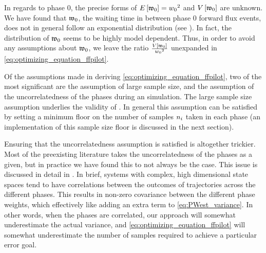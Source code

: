 In regards to phase 0, the precise forms of $E \left[ \mathfrak{w}_{0} \right] = w_{0} {}^2$ and $V \left[ \mathfrak{w}_{0} \right]$ are unknown. We have found that $\mathfrak{w}_{0}$, the waiting time in between phase 0 forward flux events, does not in general follow an exponential distribution (see ). In fact, the distribution of $\mathfrak{w}_{0}$ seems to be highly model dependent. Thus, in order to avoid any assumptions about $\mathfrak{w}_{0}$, we leave the ratio $\frac{V \left[ \mathfrak{w}_{0} \right]}{w_{0} {}^2}$ unexpanded in \eqref{eq:optimizing_equation_ffpilot}.

Of the assumptions made in deriving \eqref{eq:optimizing_equation_ffpilot}, two of the most significant are the assumption of large sample size, and the assumption of the uncorrelatedness of the phases during an  simulation. The large sample size assumption underlies the validity of . In general this assumption can be satisfied by setting a minimum floor on the number of samples $n_{i}$ taken in each phase (an implementation of this sample size floor is discussed in the next section). 

Ensuring that the uncorrelatedness assumption is satisfied is altogether trickier. Most of the preexisting  literature takes the uncorrelatedness of the phases as a given\supercite{Allen:2006ch,Borrero:2008il,Becker:2012fl}, but in practice we have found this to not always be the case. This issue is discussed in detail in . In brief, systems with complex, high dimensional state spaces tend to have correlations between the outcomes of trajectories across the different phases. This results in non-zero covariance between the different phase weights, which effectively like adding an extra term to \eqref{eq:PWest_variance}. In other words, when the phases are correlated, our approach will somewhat underestimate the actual variance, and \eqref{eq:optimizing_equation_ffpilot} will somewhat underestimate the number of samples required to achieve a particular error goal.

